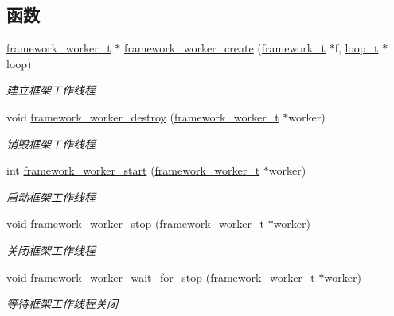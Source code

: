 \subsection*{函数}
\begin{DoxyCompactItemize}
\item 
\hyperlink{a00050_aeb7a44e6b579659a8aae81f3ab819af3_aeb7a44e6b579659a8aae81f3ab819af3}{framework\+\_\+worker\+\_\+t} $\ast$ \hyperlink{a00059_a033314598ad1544a7b6cc0cf2e5930f2_a033314598ad1544a7b6cc0cf2e5930f2}{framework\+\_\+worker\+\_\+create} (\hyperlink{a00050_a6149d769f6f07ed14a40a271c95d8463_a6149d769f6f07ed14a40a271c95d8463}{framework\+\_\+t} $\ast$f, \hyperlink{a00050_a9c3ad1cd2de83e09f3a7b59fa82c94ee_a9c3ad1cd2de83e09f3a7b59fa82c94ee}{loop\+\_\+t} $\ast$loop)
\begin{DoxyCompactList}\small\item\em 建立框架工作线程 \end{DoxyCompactList}\item 
void \hyperlink{a00059_add5ddcbe427122e3afe63a10e3448116_add5ddcbe427122e3afe63a10e3448116}{framework\+\_\+worker\+\_\+destroy} (\hyperlink{a00050_aeb7a44e6b579659a8aae81f3ab819af3_aeb7a44e6b579659a8aae81f3ab819af3}{framework\+\_\+worker\+\_\+t} $\ast$worker)
\begin{DoxyCompactList}\small\item\em 销毁框架工作线程 \end{DoxyCompactList}\item 
int \hyperlink{a00059_a8791f9f6e107cd5127797cbffcd65ea8_a8791f9f6e107cd5127797cbffcd65ea8}{framework\+\_\+worker\+\_\+start} (\hyperlink{a00050_aeb7a44e6b579659a8aae81f3ab819af3_aeb7a44e6b579659a8aae81f3ab819af3}{framework\+\_\+worker\+\_\+t} $\ast$worker)
\begin{DoxyCompactList}\small\item\em 启动框架工作线程 \end{DoxyCompactList}\item 
void \hyperlink{a00059_a22e4e55cc90068dc691d1b4de736fd6e_a22e4e55cc90068dc691d1b4de736fd6e}{framework\+\_\+worker\+\_\+stop} (\hyperlink{a00050_aeb7a44e6b579659a8aae81f3ab819af3_aeb7a44e6b579659a8aae81f3ab819af3}{framework\+\_\+worker\+\_\+t} $\ast$worker)
\begin{DoxyCompactList}\small\item\em 关闭框架工作线程 \end{DoxyCompactList}\item 
void \hyperlink{a00059_a11365f74b7c96c86c8c61d2b1f368b9c_a11365f74b7c96c86c8c61d2b1f368b9c}{framework\+\_\+worker\+\_\+wait\+\_\+for\+\_\+stop} (\hyperlink{a00050_aeb7a44e6b579659a8aae81f3ab819af3_aeb7a44e6b579659a8aae81f3ab819af3}{framework\+\_\+worker\+\_\+t} $\ast$worker)
\begin{DoxyCompactList}\small\item\em 等待框架工作线程关闭 \end{DoxyCompactList}\end{DoxyCompactItemize}


